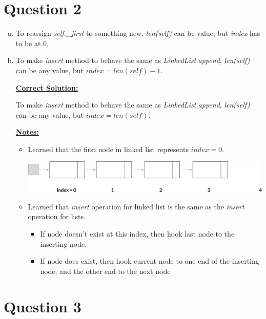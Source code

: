 \documentclass[12pt]{article}
\begin{document}
\section*{Question 2}
\begin{enumerate}[a.]
    \item To reassign \textit{self.\_first} to something new, \textit{len(self)}
    can be value, but \textit{index} has to be at 0.

    \item To make \textit{insert} method to behave the same as \textit{LinkedList.append},
    \textit{len(self)} can be any value, but $index = len(self) - 1$.

    \bigskip

    \begin{mdframed}
        \underline{\textbf{Correct Solution:}}

        \bigskip

        To make \textit{insert} method to behave the same as \textit{LinkedList.append},
        \textit{len(self)} can be any value, but \color{red}$index = len(self)$\color{black}.
    \end{mdframed}

    \bigskip

    \underline{\textbf{Notes:}}

    \bigskip

    \begin{itemize}
        \item

        Learned that the first node in linked list represents $index = 0$.

        \begin{center}
        \includegraphics[width=\linewidth]{images/worksheet_12_q1b_note_1.png}
        \end{center}

        \item Learned that \textit{insert} operation for linked list is the same as
        the \textit{insert} operation for lists.

        \begin{itemize}
            \item If node doesn't exist at this index, then hook last node to the inserting node.
            \item If node does exist, then hook current node to one end of the
            inserting node, and the other end to the next node
        \end{itemize}
    \end{itemize}
\end{enumerate}


\section*{Question 3}
\end{document}
